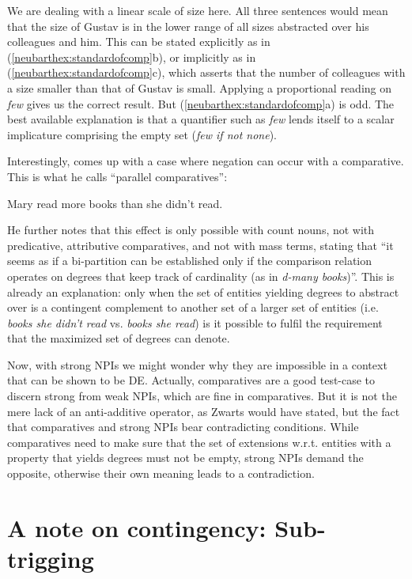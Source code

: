\documentclass[output=paper,colorlinks,citecolor=brown,
]{langscibook}
\begin{document}
We are dealing with a linear scale of size here. All three sentences would mean that the size of Gustav is in the
lower range of all sizes abstracted over his colleagues and him. This can be stated explicitly as in (\ref{neubarthex:standardofcomp}b),
or implicitly as in (\ref{neubarthex:standardofcomp}c), which asserts that the number of colleagues with a size smaller than that of Gustav is small. Applying a proportional reading on \textit{few} gives us the correct result. But (\ref{neubarthex:standardofcomp}a) is odd. The best available explanation is that a quantifier such as \textit{few} lends itself to a scalar implicature comprising the empty set
(\textit{few if not none}).

Interestingly, \citet[12]{lechner2002} comes up with a case where negation can occur with a comparative. This is what
he calls “parallel comparatives”:

\ea \label{neubarth7} Mary read more books than she didn't read. \z

He further notes that this effect is only possible with count nouns, not with predicative, attributive comparatives,
and not with mass terms, stating that ``it seems as if a bi-partition can be established only if the comparison
relation operates on degrees that keep track of cardinality (as in \textit{d-many books})''. This is already
an explanation: only when the set of entities yielding degrees to abstract over is a contingent complement to another
set of a larger set of entities (i.e. \textit{books she didn't read} vs. \textit{books she read}) is it possible to
fulfil the requirement that the maximized set of degrees can denote.

Now, with strong NPIs we might wonder why they are impossible in a context that can be shown to be DE. Actually,
comparatives are a good test-case to discern strong from weak NPIs, which are fine in comparatives. But it is not the
mere lack of an anti-additive operator, as Zwarts would have stated, but the fact that comparatives and strong NPIs
bear contradicting conditions. While comparatives need to make sure that the set of extensions w.r.t. entities with a property that yields degrees must not be empty, strong NPIs demand the opposite, otherwise their own meaning leads to a contradiction.

\section{A note on contingency: Sub-trigging}\largerpage
\end{document}
